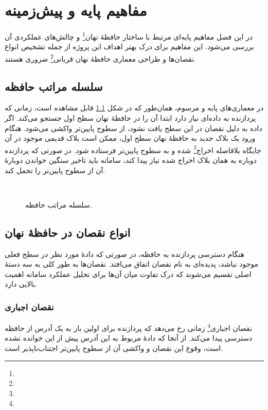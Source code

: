 \chapter{مفاهیم پایه و پیش‌زمینه}

در این فصل مفاهیم پایه‌ای مرتبط با ساختار حافظهٔ نهان\footnote{} و چالش‌های عملکردی آن بررسی می‌شود. این مفاهیم برای درک بهتر اهداف این پروژه از جمله تشخیص انواع نقصان‌ها و طراحی معماری حافظهٔ نهان قربانی\footnote{} ضروری هستند.

\section{سلسله مراتب حافظه}
در معماری‌های پایه و مرسوم، همان‌طور که در شکل \ref{memory hierarchy} قابل مشاهده است، زمانی که پردازنده به داده‌ای نیاز دارد ابتدا آن را در حافظهٔ نهان سطح اول جستجو می‌کند. اگر داده به دلیل نقصان در این سطح یافت نشود، از سطوح پایین‌تر واکشی می‌شود. هنگام ورود یک بلاک جدید به حافظهٔ نهان سطح اول، ممکن است بلاک قدیمی موجود در آن جایگاه بلافاصله اخراج\footnote{} شده و به سطوح پایین‌تر فرستاده شود. در صورتی که پردازنده دوباره به همان بلاک اخراج شده نیاز پیدا کند، سامانه باید تاخیر سنگین خواندن دوبارهٔ آن از سطوح پایین‌تر را تحمل کند.\cite{wikipediaMemoryHierarchy}


\begin{figure}[ht]
	‫
	\caption{سلسله مراتب حافظه.}
	\label{memory hierarchy}
\end{figure}


\section{انواع نقصان در حافظهٔ نهان}

هنگام دسترسی پردازنده به حافظه، در صورتی که دادهٔ مورد نظر در سطح فعلی موجود نباشد، پدیده‌ای به نام نقصان اتفاق می‌افتد. نقصان‌ها به طور کلی به سه دستهٔ اصلی تقسیم می‌شوند که درک تفاوت میان آن‌ها برای تحلیل عملکرد سامانه اهمیت بالایی دارد.\cite{geeksForGeeksMiss, jouppi1990}

\subsection{نقصان اجباری}
نقصان اجباری\footnote{} زمانی رخ می‌دهد که پردازنده برای اولین بار به یک آدرس از حافظه دسترسی پیدا می‌کند. از آنجا که دادهٔ مربوط به این آدرس پیش از این خوانده نشده است، وقوع این نقصان و واکشی آن از سطوح پایین‌تر اجتناب‌ناپذیر است.

